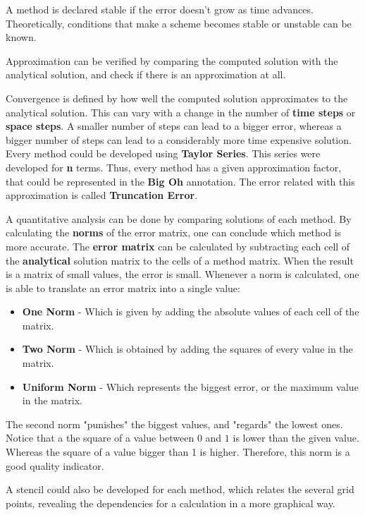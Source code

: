 \documentclass[12pt]{report}
\begin{document}
\par A method is declared stable if the error doesn't grow as time advances. Theoretically, conditions that make a scheme becomes stable or unstable can be known.
\par Approximation can be verified by comparing the computed solution with the analytical solution, and check if there is an approximation at all.
\par Convergence is defined by how well the computed solution approximates to the analytical solution. This can vary with a change in the number of \textbf{time steps} or \textbf{space steps}. A smaller number of steps can lead to a bigger error, whereas a bigger number of steps can lead to a considerably more time expensive solution. Every method could be developed using \textbf{Taylor Series}. This series were developed for \textbf{n} terms. Thus, every method has a given approximation factor, that could be represented in the \textbf{Big Oh} annotation. The error related with this approximation is called \textbf{Truncation Error}.
\par A quantitative analysis can be done by comparing solutions of each method. By calculating the \textbf{norms} of the error matrix, one can conclude which method is more accurate. The \textbf{error matrix} can be calculated by subtracting each cell of the \textbf{analytical} solution matrix to the cells of a method matrix. When the result is a matrix of small values, the error is small. Whenever a norm is calculated, one is able to translate an error matrix into a single value:

\begin{itemize}[noitemsep] 
\item \textbf{One Norm} - Which is given by adding the absolute values of each cell of the matrix.
\item \textbf{Two Norm} - Which is obtained by adding the squares of every value in the matrix.
\item \textbf{Uniform Norm} - Which represents the biggest error, or the maximum value in the matrix.
\end{itemize}

The second norm "punishes" the biggest values, and "regards" the lowest ones. Notice that a the square of a value between $0$ and $1$ is lower than the given value. Whereas the square of a value bigger than 1 is higher. Therefore, this norm is a good quality indicator. 

\par A stencil could also be developed for each method, which relates the several grid points, revealing the dependencies for a calculation in a more graphical way. 
\end{document}
